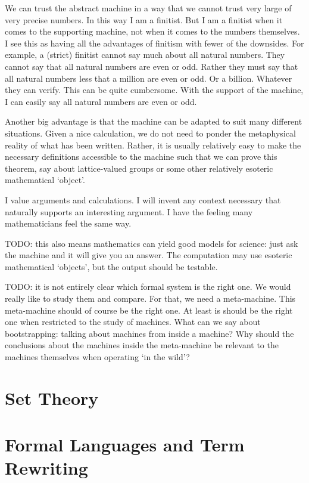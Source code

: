 \documentclass{report}
\begin{document}
We can trust the abstract machine in a way that we cannot trust very large of very precise numbers. In this way I am a finitist. But I am a finitist when it comes to the supporting machine, not when it comes to the numbers themselves. I see this as having all the advantages of finitism with fewer of the downsides. For example, a (strict) finitist cannot say much about all natural numbers. They cannot say that all natural numbers are even or odd. Rather they must say that all natural numbers less that a million are even or odd. Or a billion. Whatever they can verify. This can be quite cumbersome. With the support of the machine, I can easily say all natural numbers are even or odd.

Another big advantage is that the machine can be adapted to suit many different situations. Given a nice calculation, we do not need to ponder the metaphysical reality of what has been written. Rather, it is usually relatively easy to make the necessary definitions accessible to the machine such that we can prove this theorem, say about lattice-valued groups or some other relatively esoteric mathematical `object'.

I value arguments and calculations. I will invent any context necessary that naturally supports an interesting argument. I have the feeling many mathematicians feel the same way.

TODO: this also means mathematics can yield good models for science: just ask the machine and it will give you an answer. The computation may use esoteric mathematical `objects', but the output should be testable.

TODO: it is not entirely clear which formal system is the right one. We would really like to study them and compare. For that, we need a meta-machine. This meta-machine should of course be the right one. At least is should be the right one when restricted to the study of machines. What can we say about bootstrapping: talking about machines from inside a machine? Why should the conclusions about the machines inside the meta-machine be relevant to the machines themselves when operating `in the wild'?

\part{Set Theory}
\setcounter{chapter}{0} %



\part{Formal Languages and Term Rewriting}
\setcounter{chapter}{0} %

\end{document}
